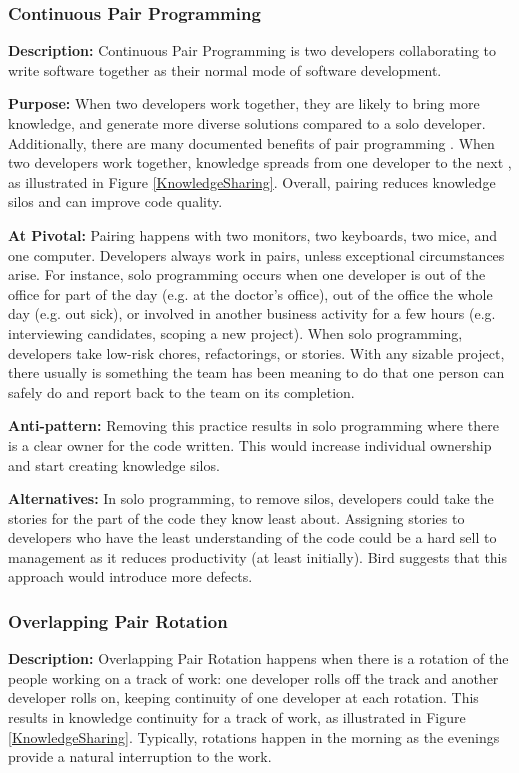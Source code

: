 \subsubsection{Continuous Pair Programming}
\textbf{Description:} Continuous Pair Programming is two developers collaborating to write software together as their normal mode of software development.

\textbf{Purpose:} When two developers work together, they are likely to bring more knowledge, and generate more diverse solutions compared to a solo developer. Additionally, there are many documented benefits of pair programming \cite {Williams2002}. When two developers work together, knowledge spreads from one developer to the next \cite{Zieris2016KnowledgeTransfer}, as illustrated in Figure \ref{KnowledgeSharing}. Overall, pairing reduces knowledge silos and can improve code quality.

\textbf{At Pivotal:} Pairing happens with two monitors, two keyboards, two mice, and one computer. Developers always work in pairs, unless exceptional circumstances arise. For instance, solo programming occurs when one developer is out of the office for part of the day (e.g. at the doctor's office), out of the office the whole day (e.g. out sick), or involved in another business activity for a few hours (e.g. interviewing candidates, scoping a new project). When solo programming, developers take low-risk chores, refactorings, or stories. With any sizable project, there usually is something the team has been meaning to do that one person can safely do and report back to the team on its completion. 

\textbf{Anti-pattern:} Removing this practice results in solo programming where there is a clear owner for the code written. This would increase individual ownership and start creating knowledge silos. 

\textbf{Alternatives:} In solo programming, to remove silos, developers could take the stories for the part of the code they know least about. Assigning stories to developers who have the least understanding of the code could be a hard sell to management as it reduces productivity (at least initially). Bird \cite{BirdDontTouchMyCode} suggests that this approach would introduce more defects. 

\subsubsection{Overlapping Pair Rotation}
\label{OverlappingPairRotationSection}
\textbf{Description:} Overlapping Pair Rotation happens when there is a rotation of the people working on a track of work: one developer rolls off the track and another developer rolls on, keeping continuity of one developer at each rotation. This results in knowledge continuity for a track of work, as illustrated in Figure \ref{KnowledgeSharing}. Typically, rotations happen in the morning as the evenings provide a natural interruption to the work. 

